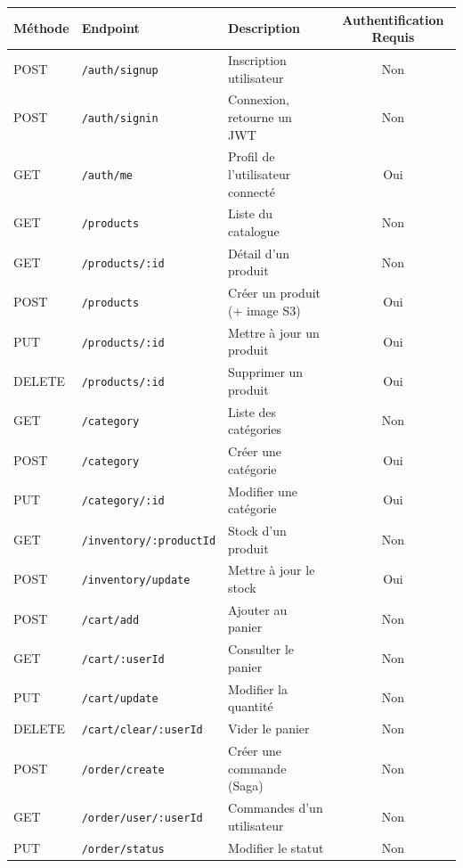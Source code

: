 \begin{table}[htbp]
    \centering
    \begin{tabular}{|l|l|l|c|}
        \hline
        \textbf{Méthode} & \textbf{Endpoint} & \textbf{Description} & \textbf{Authentification Requis} \\
        \hline
        POST & \texttt{/auth/signup} & Inscription utilisateur & Non \\
        POST & \texttt{/auth/signin} & Connexion, retourne un JWT & Non \\
        GET  & \texttt{/auth/me} & Profil de l'utilisateur connecté & Oui \\
        \hline
        GET  & \texttt{/products} & Liste du catalogue & Non \\
        GET  & \texttt{/products/:id} & Détail d'un produit & Non \\
        POST & \texttt{/products} & Créer un produit (+ image S3) & Oui \\
        PUT  & \texttt{/products/:id} & Mettre à jour un produit & Oui \\
        DELETE & \texttt{/products/:id} & Supprimer un produit & Oui \\
        \hline
        GET  & \texttt{/category} & Liste des catégories & Non \\
        POST & \texttt{/category} & Créer une catégorie & Oui \\
        PUT  & \texttt{/category/:id} & Modifier une catégorie & Oui \\
        \hline
        GET  & \texttt{/inventory/:productId} & Stock d'un produit & Non \\
        POST & \texttt{/inventory/update} & Mettre à jour le stock & Oui \\
        \hline
        POST & \texttt{/cart/add} & Ajouter au panier & Non \\
        GET  & \texttt{/cart/:userId} & Consulter le panier & Non \\
        PUT  & \texttt{/cart/update} & Modifier la quantité & Non \\
        DELETE & \texttt{/cart/clear/:userId} & Vider le panier & Non \\
        \hline
        POST & \texttt{/order/create} & Créer une commande (Saga) & Non \\
        GET  & \texttt{/order/user/:userId} & Commandes d'un utilisateur & Non \\
        PUT  & \texttt{/order/status} & Modifier le statut & Non \\

\end{tabular}
\end{table}
